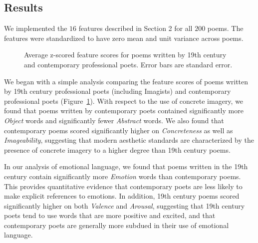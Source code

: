 \documentclass{book}
\begin{document}
\subsection{Results}

We implemented the $16$ features described in Section 2 for all $200$ poems. The features were standardized to have zero mean and unit variance across poems. 

\begin{figure}
\label{fig1}
\caption{Average z-scored feature scores for poems written by 19th century and contemporary professional poets. Error bars are standard error.} 
\end{figure}

We began with a simple analysis comparing the feature scores of poems written by 19th century professional poets (including Imagists) and contemporary professional poets (Figure~\ref{fig1}). With respect to the use of concrete imagery, we found that poems written by contemporary poets contained significantly more \emph{Object} words and significantly fewer \emph{Abstract} words.
We also found that contemporary poems scored significantly higher on \emph{Concreteness} as well as \emph{Imageability}, suggesting that modern aesthetic standards are characterized by the presence of concrete imagery to a higher degree than 19th century poems.

In our analysis of emotional language, we found that poems written in the 19th century contain significantly more \emph{Emotion} words than contemporary poems. This provides quantitative evidence that contemporary poets are less likely to make explicit references to emotions. In addition, 19th century poems scored significantly higher on both \emph{Valence} and \emph{Arousal}, suggesting that 19th century poets tend to use words that are more positive and excited, and that contemporary poets are generally more subdued in their use of emotional language. 
\end{document}
